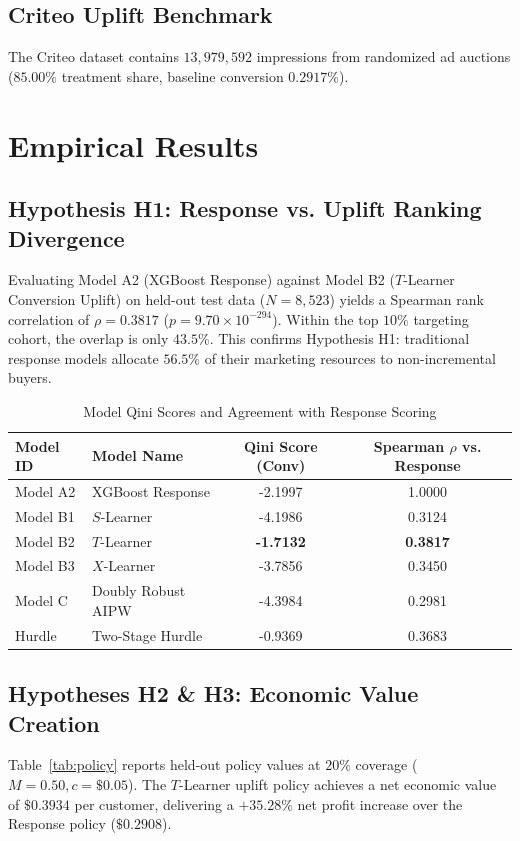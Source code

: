 \documentclass[11pt,a4paper]{article}
\begin{document}
\subsection{Criteo Uplift Benchmark}
The Criteo dataset \citep{diemert2018large} contains $13,979,592$ impressions from randomized ad auctions ($85.00\%$ treatment share, baseline conversion $0.2917\%$).

\section{Empirical Results}

\subsection{Hypothesis H1: Response vs. Uplift Ranking Divergence}
Evaluating Model A2 (XGBoost Response) against Model B2 ($T$-Learner Conversion Uplift) on held-out test data ($N = 8,523$) yields a Spearman rank correlation of $\rho = 0.3817$ ($p = 9.70 \times 10^{-294}$). Within the top $10\%$ targeting cohort, the overlap is only $43.5\%$. This confirms Hypothesis H1: traditional response models allocate $56.5\%$ of their marketing resources to non-incremental buyers.

\begin{table}[h]
\centering
\small
\caption{Model Qini Scores and Agreement with Response Scoring}
\label{tab:qini}
\begin{tabular}{llcc}
\toprule
Model ID & Model Name & Qini Score (Conv) & Spearman $\rho$ vs. Response \\
\midrule
Model A2 & XGBoost Response & -2.1997 & 1.0000 \\
Model B1 & $S$-Learner & -4.1986 & 0.3124 \\
Model B2 & $T$-Learner & \textbf{-1.7132} & \textbf{0.3817} \\
Model B3 & $X$-Learner & -3.7856 & 0.3450 \\
Model C & Doubly Robust AIPW & -4.3984 & 0.2981 \\
Hurdle & Two-Stage Hurdle & -0.9369 & 0.3683 \\
\bottomrule
\end{tabular}
\end{table}

\subsection{Hypotheses H2 \& H3: Economic Value Creation}
Table~\ref{tab:policy} reports held-out policy values at $20\%$ coverage ($M = 0.50, c = \$0.05$). The $T$-Learner uplift policy achieves a net economic value of $\$0.3934$ per customer, delivering a $+35.28\%$ net profit increase over the Response policy ($\$0.2908$).
\end{document}

